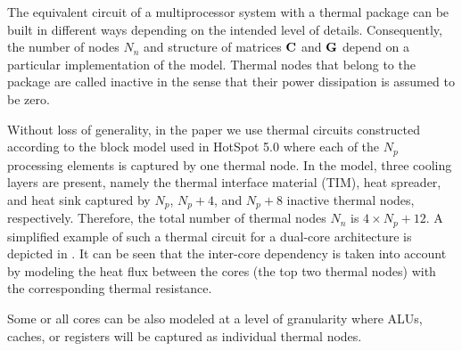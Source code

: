 The equivalent circuit of a multiprocessor system with a thermal package can be built in different ways depending on the intended level of details. Consequently, the number of nodes $N_n$ and structure of matrices $\mathbf{C}$ and $\mathbf{G}$ depend on a particular implementation of the model. Thermal nodes that belong to the package are called inactive in the sense that their power dissipation is assumed to be zero.

Without loss of generality, in the paper we use thermal circuits constructed according to the block model used in HotSpot 5.0 \cite{huang2003} where each of the $N_p$ processing elements is captured by one thermal node. In the model, three cooling layers are present, namely the thermal interface material (TIM), heat spreader, and heat sink captured by $N_p$, $N_p + 4$, and $N_p + 8$ inactive thermal nodes, respectively. Therefore, the total number of thermal nodes $N_n$ is $4 \times N_p + 12$. A simplified example of such a thermal circuit for a dual-core architecture is depicted in . It can be seen that the inter-core dependency is taken into account by modeling the heat flux between the cores (the top two thermal nodes) with the corresponding thermal resistance.

Some or all cores can be also modeled at a  level of granularity where ALUs, caches, or registers will be captured as individual thermal nodes.
